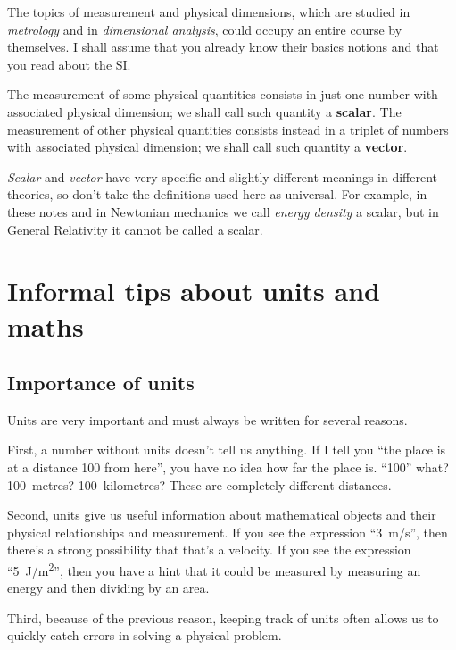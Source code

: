 \documentclass[a4paper,12pt,%
onecolumn,oneside,%
british%
]{memoir}
\renewcommand*{\|}[1][]{\nonscript\:#1\vert\nonscript\:\mathopen{}}
\begin{document}
The topics of measurement and physical dimensions, which are studied in \emph{metrology} and in \emph{dimensional analysis}, could occupy an entire course by themselves. I shall assume that you already know their basics notions and that you read about the SI.

\smallskip

The measurement of some physical quantities consists in just one number with associated physical dimension; we shall call such quantity a \textbf{scalar}. The measurement of other physical quantities consists instead in a triplet of numbers with associated physical dimension; we shall call such quantity a \textbf{vector}.
\begin{warning}
  \emph{Scalar} and \emph{vector} have very specific and slightly different meanings in different theories, so don't take the definitions used here as universal. For example, in these notes and in Newtonian mechanics we call \emph{energy density} a scalar, but in General Relativity it cannot be called a scalar.
\end{warning}

\section{Informal tips about units and maths}
\label{sec:units_maths}

\subsection{Importance of units}
\label{sec:importance_units}

Units are very important and must always be written for several reasons.

First, a number without units doesn't tell us anything. If I tell you \enquote{the place is at a distance 100 from here}, you have no idea how far the place is. \enquote{100} what? 100~metres? 100~kilometres? These are completely different distances.

Second, units give us useful information about mathematical objects and their physical relationships and measurement. If you see the expression \enquote{\qty{3}{m/s}}, then there's a strong possibility that that's a velocity. If you see the expression \enquote{\qty{5}{J/m^2}}, then you have a hint that it could be measured by measuring an energy and then dividing by an area.

Third, because of the previous reason, keeping track of units often allows us to quickly catch errors in solving a physical problem.
\end{document}

